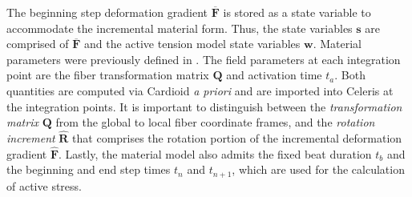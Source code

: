 The beginning step deformation gradient $\overline{\bm{F}}$ is stored as a state variable to accommodate the incremental material form. Thus, the state variables $\bm{s}$ are comprised of $\overline{\bm{F}}$ and the active tension model state variables $\bm{w}$. Material parameters were previously defined in . The field parameters at each integration point are the fiber transformation matrix $\bm{Q}$ and activation time $t_a$. Both quantities are computed via Cardioid \textit{a priori} and are imported into Celeris at the integration points. It is important to distinguish between the \textit{transformation matrix} $\bm{Q}$ from the global to local fiber coordinate frames, and the \textit{rotation increment} $\hat{\bm{R}}$ that comprises the rotation portion of the incremental deformation gradient $\hat{\bm{F}}$. Lastly, the material model also admits the fixed beat duration $t_b$ and the beginning and end step times $t_n$ and $t_{n+1}$, which are used for the calculation of active stress.

